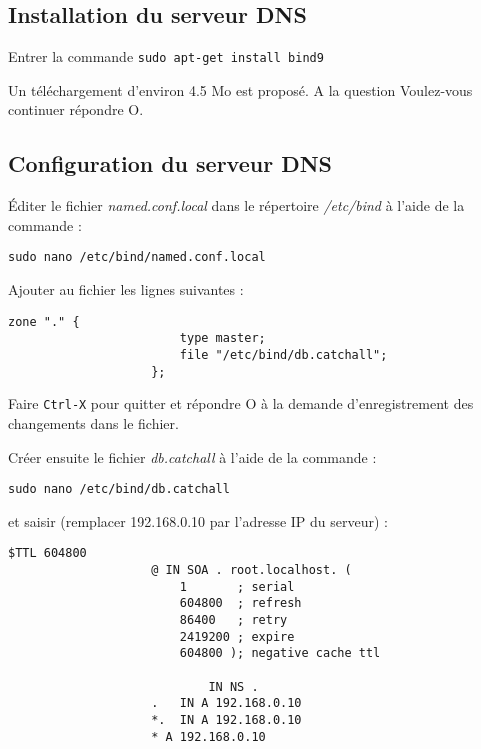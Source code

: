 \documentclass[a4paper]{ffco-rapport}
\begin{document}
	\subsection{Installation du serveur DNS}
		Entrer la commande \verb|sudo apt-get install bind9|

		Un téléchargement d'environ 4.5 Mo est proposé. A la question \og{}Voulez-vous continuer\fg{} répondre O.
	
	\subsection{Configuration du serveur DNS}
		Éditer le fichier \emph{named.conf.local} dans le répertoire \emph{/etc/bind} à l'aide de la commande :
		
		\verb|sudo nano /etc/bind/named.conf.local|
		
		Ajouter au fichier les lignes suivantes :
		
		\lstset{tabsize=2}
		\begin{center}
			\ttfamily
			\begin{minipage}{8cm}
				\begin{lstlisting}[basicstyle=\small,language={},gobble=10]
					zone "." {
						type master;
						file "/etc/bind/db.catchall";
					};
				\end{lstlisting}
			\end{minipage}
		\end{center}

		Faire \verb|Ctrl-X| pour quitter et répondre O à la demande d'enregistrement des changements dans le fichier.

		Créer ensuite le fichier \emph{db.catchall} à l'aide de la commande :
		
		\verb|sudo nano /etc/bind/db.catchall|
		
		et saisir (remplacer 192.168.0.10 par l'adresse IP du serveur) :
		
		\lstset{tabsize=2,showspaces=false,showtabs=false,tab=\rightarrowfill}
		\begin{center}
			\ttfamily
			\begin{minipage}{10cm}
				\begin{lstlisting}[basicstyle=\small,language={},gobble=10]
					$TTL 604800
					@ IN SOA . root.localhost. (
						1       ; serial
						604800  ; refresh
						86400   ; retry
						2419200 ; expire
						604800 ); negative cache ttl

							IN NS .
					.   IN A 192.168.0.10
					*.  IN A 192.168.0.10
					* A 192.168.0.10
				\end{lstlisting}
			\end{minipage}
		\end{center}
\end{document}
